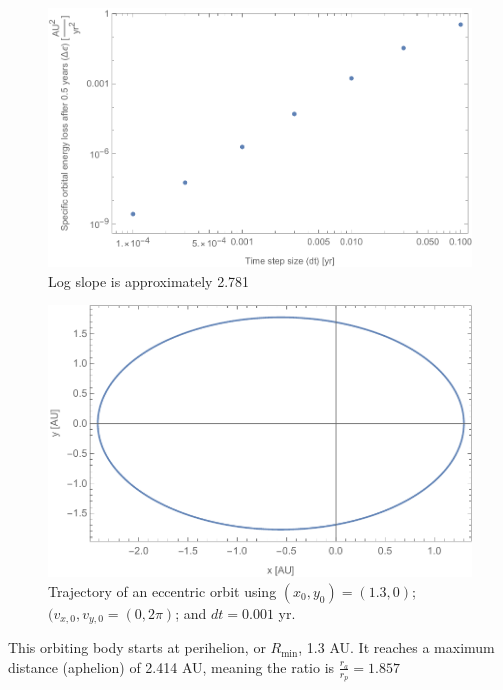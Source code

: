 \documentclass{article}
\begin{document}
\begin{figure}[h!]
    \centering
    \includegraphics[width=5in]{homework3/q2_energyloss.pdf}
    \caption{Log slope is approximately 2.781}
    \label{fig:q2energy}
\end{figure}

\bigskip
{}
\medskip

\begin{figure}[h!]
    \centering
    \includegraphics[width=5in]{homework3/q3_orbit.pdf}
    \caption{Trajectory of an eccentric orbit using $(x_0,y_0)=(1.3,0)$; $(v_{x,0},v_{y,0}=(0,2\pi)$; and $dt=0.001$ yr.}
    \label{fig:q3orbit}
\end{figure}

This orbiting body starts at perihelion, or $R_\text{min}$, 1.3 AU. It reaches a maximum distance (aphelion) of 2.414 AU, meaning the ratio is $\frac{r_a}{r_p}=1.857$
\end{document}
